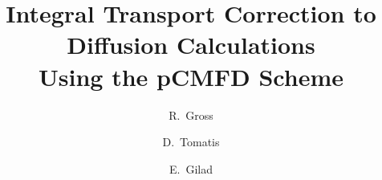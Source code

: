 \documentclass[preprint, authoryear, 12pt, a4paper, onecolumn]{elsarticle}
\begin{document}
	
\begin{frontmatter}
        
  \title{Integral Transport Correction to Diffusion Calculations \\ Using the pCMFD Scheme}
  
  \author[bgu]{R.~Gross}
  \author[cea]{D.~Tomatis}
  \author[bgu]{E.~Gilad}
  
  
  \address[bgu]{The Unit of Nuclear Engineering, Ben-Gurion University of the Negev, Beer-Sheva 8410501, Israel}
  \address[cea]{CEA, DEN, Service d{'}\'etudes des r\'eacteurs et de math\'ematiques appliqu\'ees (SERMA), \\
                Universit\'e Paris-Saclay, F-91191, Gif-sur-Yvette, France}
  
  
  \begin{keyword}
  
  \end{keyword}
\end{frontmatter}


\modulolinenumbers[5]
\linenumbers



%
%




%
\end{document}
